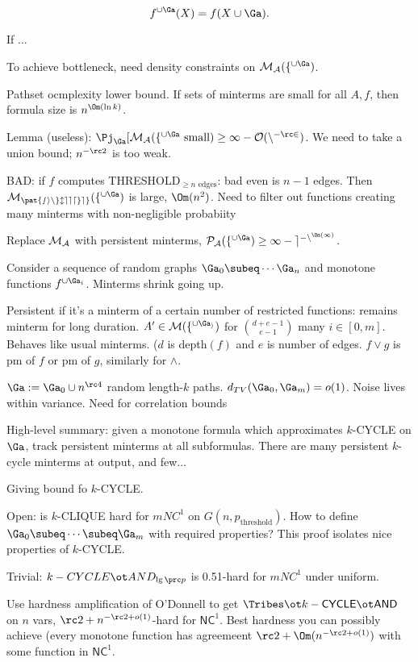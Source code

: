 \[
f^{\cup \Ga}(X)=f(X\cup \Ga).
\]

If ...

To achieve bottleneck, need density constraints on $\cal M_A(f^{\cup \Ga})$.

Pathset ocmplexity lower bound. If sets of minterms are small for all $A,f$, then formula size is $n^{\Om(\ln k)}$.

Lemma (useless): $\Pj_\Ga[\cal M_A(f^{\cup \Ga}\text{ small})\ge 1-O(n^{-\rc2})$. We need to take a union bound; $n^{-\rc 2}$ is too weak.


BAD: if $f$ computes THRESHOLD${}_{\ge n\text{ edges}}$: bad even is $n-1$ edges. Then $\cal M_{\pat{single edge}}(f^{\cup \Ga})$ is large, $\Om(n^2)$. Need to filter out functions creating many minterms with non-negligible probabiity

Replace $\cal M_A$ with persistent minterms, $\cal P_A(f^{\cup \Ga})\ge 1-e^{-n^{\Om(1)}}$.

Consider a sequence of random graphs $\Ga_0\subeq \cdots \Ga_n$ and monotone functions $f^{\cup \Ga_i}$. Minterms shrink going up.

Persistent if it's a minterm of a certain number of restricted functions: remains minterm for long duration. $A'\in \cal M(f^{\cup \Ga_i})$ for $\binom{d+e-1}{e-1}$ many $i\in [0,m]$. Behaves like usual minterms. ($d$ is depth$(f)$ and $e$ is number of edges. 
$f\vee g$ is pm of $f$ or pm of $g$, similarly for $\wedge$.

$\Ga:=\Ga_0\cup n^{\rc 4}$ random length-$k$ paths. $d_{TV}(\Ga_0,\Ga_m)=o(1)$.
Noise lives within variance. Need for correlation bounds

High-level summary: given a monotone formula which approximates $k$-CYCLE on $\Ga$, track persistent minterms at all subformulas. There are many persistent $k$-cycle minterms at output, and few...

Giving bound fo $k$-CYCLE. 

Open: is $k$-CLIQUE hard for $mNC^1$ on $G(n,p_{\text{threshold}})$. How to define $\Ga_0\subeq \cdots \subeq \Ga_m$ with required properties? This proof isolates nice properties of $k$-CYCLE.

Trivial: $k-CYCLE\ot AND_{\lg\prc p}$ is 0.51-hard for $mNC^1$ under uniform.

Use hardness amplification of O'Donnell to get $\Tribes \ot k-\mathsf{CYCLE}\ot \mathsf{AND}$ on $n$ vars, $\rc2+n^{-\rc 2+o(1)}$-hard for $\mathsf{NC}^1$. Best hardness you can possibly achieve (every monotone function has agreemeent $\rc2+\Om(n^{-\rc2+o(1)})$ with some function in $\mathsf{NC}^1$. 

